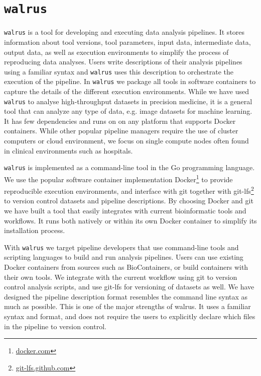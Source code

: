 \section{\texttt{walrus}} 
\texttt{walrus} is a tool for developing and executing data analysis pipelines.
It stores information about tool versions, tool parameters, input data,
intermediate data, output data, as well as execution environments to simplify
the process of reproducing data analyses. Users write descriptions of their
analysis pipelines using a familiar syntax and \texttt{walrus}  uses this
description to orchestrate the execution of the pipeline. In \texttt{walrus}  we
package all tools in software containers to capture the details of the different
execution environments. While we have used \texttt{walrus}  to analyse
high-throughput datasets in precision medicine, it is a general tool that can
analyze any type of data, e.g. image datasets for machine learning. It has few
dependencies and runs on on any platform that supports Docker containers. While
other popular pipeline managers require the use of cluster computers or cloud
environment, we focus on single compute nodes often found in clinical
environments such as hospitals. 

\texttt{walrus} is implemented as a command-line tool in the Go programming
language. We use the popular software container implementation
Docker\footnote{\url{docker.com}} to provide reproducible execution
environments, and interface with git together with
git-lfs\footnote{\url{git-lfs.github.com}} to version control datasets and
pipeline descriptions. By choosing Docker and git we have built a tool that
easily integrates with current bioinformatic tools and workflows. It runs both
natively or within its own Docker container to simplify its installation
process.

With \texttt{walrus} we target pipeline developers that use command-line tools
and scripting languages to build and run analysis pipelines. Users can use
existing Docker containers from sources such as
BioContainers,\cite{biocontainers} or build containers with their own tools.  We
integrate with the current workflow using git to version control analysis
scripts, and use git-lfs for versioning of datasets as well. We have
designed the pipeline description format resembles the command line syntax as
much as possible. This is one of the major strengths of walrus. It uses a
familiar syntax and format, and does not require the users to explicitly
declare which files in the pipeline to version control. 


